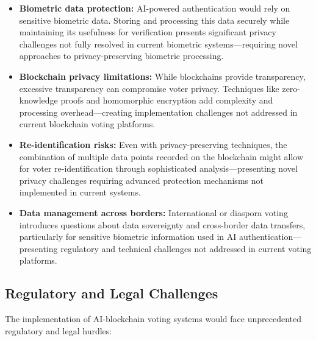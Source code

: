 \documentclass[conference]{IEEEtran}
\begin{document}
\begin{itemize}
    \item \textbf{Biometric data protection:} AI-powered authentication would rely on sensitive biometric data. Storing and processing this data securely while maintaining its usefulness for verification presents significant privacy challenges not fully resolved in current biometric systems—requiring novel approaches to privacy-preserving biometric processing.
    
    \item \textbf{Blockchain privacy limitations:} While blockchains provide transparency, excessive transparency can compromise voter privacy. Techniques like zero-knowledge proofs and homomorphic encryption add complexity and processing overhead—creating implementation challenges not addressed in current blockchain voting platforms.
    
    \item \textbf{Re-identification risks:} Even with privacy-preserving techniques, the combination of multiple data points recorded on the blockchain might allow for voter re-identification through sophisticated analysis—presenting novel privacy challenges requiring advanced protection mechanisms not implemented in current systems.
    
    \item \textbf{Data management across borders:} International or diaspora voting introduces questions about data sovereignty and cross-border data transfers, particularly for sensitive biometric information used in AI authentication—presenting regulatory and technical challenges not addressed in current voting platforms.
\end{itemize}

\subsection{Regulatory and Legal Challenges}
The implementation of AI-blockchain voting systems would face unprecedented regulatory and legal hurdles:
\end{document}
